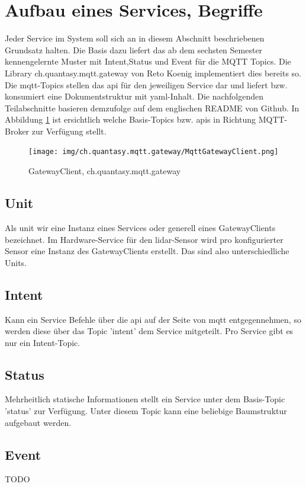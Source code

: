 \documentclass[11pt,english,german]{report}
\begin{document}
\section{Aufbau eines Services, Begriffe}
Jeder Service im System soll sich an in diesem Abschnitt beschriebenen Grundsatz halten. Die Basis dazu liefert das ab dem sechsten Semester kennengelernte Muster mit Intent,Status und Event für die MQTT Topics. Die Library ch.quantasy.mqtt.gateway\cite{ch.quantasy.mqtt.gateway} von Reto Koenig implementiert dies bereits so. Die \acrshort{mqtt}-Topics stellen das \acrshort{api} für den jeweiligen Service dar und liefert bzw. konsumiert eine Dokumentstruktur mit \acrshort{yaml}-Inhalt. Die nachfolgenden Teilabschnitte basieren demzufolge auf dem englischen README von Github\cite{ch.quantasy.mqtt.gateway}. In Abbildung \ref{fig:gatewayclient} ist ersichtlich welche Basis-Topics bzw. \acrshort{api}s in Richtung MQTT-Broker zur Verfügung stellt.

\begin{figure}[H]
	\centering
	\texttt{[image: img/ch.quantasy.mqtt.gateway/MqttGatewayClient.png]}
    \caption{GatewayClient, ch.quantasy.mqtt.gateway\cite{ch.quantasy.mqtt.gateway}}
    \label{fig:gatewayclient}
\end{figure}



\subsection{Unit}
Als \gls{unit} wir eine Instanz eines Services oder generell eines GatewayClients bezeichnet. Im Hardware-Service für den \acrshort{lidar}-Sensor wird pro konfigurierter Sensor eine Instanz des GatewayClients erstellt. Das sind also unterschiedliche Units.
\subsection{Intent}
Kann ein Service Befehle über die \acrshort{api} auf der Seite von \acrshort{mqtt} entgegennehmen, so werden diese über das Topic '\gls{intent}' dem Service mitgeteilt. Pro Service gibt es nur ein Intent-Topic.
\subsection{Status}
Mehrheitlich statische Informationen stellt ein Service unter dem Basis-Topic '\gls{status}' zur Verfügung. Unter diesem Topic kann eine beliebige Baumstruktur aufgebaut werden.
\subsection{Event}
TODO
\end{document}
